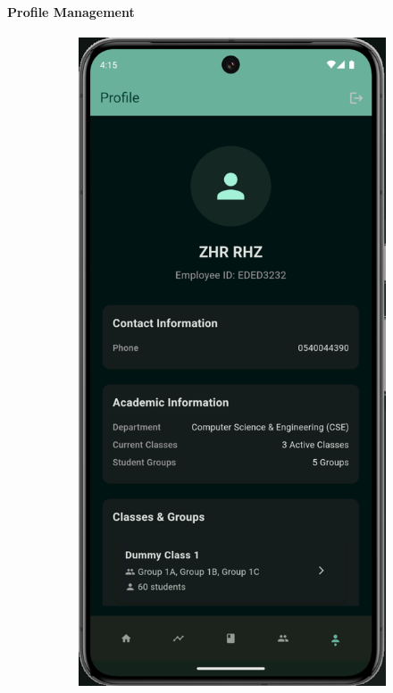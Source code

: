 \paragraph{Profile Management}
\clearpage
\begin{figure}[H]
    \centering
    \begin{subfigure}[b]{0.48\textwidth}
        \includegraphics[width=\textwidth]{images/rachid/teacher-side-profile.png}

\end{subfigure}
\end{figure}
